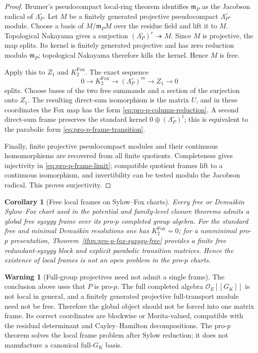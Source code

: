 \documentclass[11pt]{article}
\newtheorem{corollary}[theorem]{Corollary}
\theoremstyle{definition}
\newtheorem{warning}[theorem]{Warning}
\begin{document}
\begin{proof}
Brumer's pseudocompact local-ring theorem identifies
$\mathfrak m_P$ as the Jacobson radical of $\Lambda_P^{\circ}$.
Let $M$ be a finitely generated projective pseudocompact
$\Lambda_P^{\circ}$-module.  Choose a basis of
$M/\mathfrak m_PM$ over the residue field and lift it to $M$.
Topological Nakayama gives a surjection
$(\Lambda_P^{\circ})^r\twoheadrightarrow M$.  Since $M$ is projective,
the map splits.  Its kernel is finitely generated projective and has
zero reduction modulo $\mathfrak m_P$; topological Nakayama therefore
kills the kernel.  Hence $M$ is free.

Apply this to $Z_1$ and $K_2^{\mathrm{Fox}}$.  The exact sequence
\[
0\longrightarrow K_2^{\mathrm{Fox}}
\longrightarrow(\Lambda_P^{\circ})^m
\longrightarrow Z_1\longrightarrow0
\]
splits.  Choose bases of the two free summands and a section of the
surjection onto $Z_1$.  The resulting direct-sum isomorphism is the
matrix $U$, and in these coordinates the Fox map has the form
\eqref{eq:pro-p-column-reduction}.  A second direct-sum frame preserves
the standard kernel $0\oplus(\Lambda_P^{\circ})^t$; this is equivalent
to the parabolic form \eqref{eq:pro-p-frame-transition}.

Finally, finite projective pseudocompact modules and their continuous
homomorphisms are recovered from all finite quotients.  Completeness gives
injectivity in \eqref{eq:pro-p-frame-limit}; compatible quotient frames
lift to a continuous isomorphism, and invertibility can be tested modulo
the Jacobson radical.  This proves surjectivity.
\end{proof}

\begin{corollary}[Free local frames on Sylow--Fox charts]\label{cor:sylow-fox-free-frames}
Every free or Demu\v{s}kin Sylow--Fox chart used in the potential and
family-level closure theorems admits a global free syzygy frame over its
pro-$p$ completed group algebra.  For the standard free and minimal
Demu\v{s}kin resolutions one has $K_2^{\mathrm{Fox}}=0$; for a
nonminimal pro-$p$ presentation, Theorem~\ref{thm:pro-p-fox-syzygy-free}
provides a finite free redundant-syzygy block and explicit parabolic
transition matrices.  Hence the existence of local frames is not an open
problem in the pro-$p$ charts.
\end{corollary}

\begin{warning}[Full-group projectives need not admit a single frame]\label{warn:full-group-not-local}
The conclusion above uses that $P$ is pro-$p$.  The full completed algebra
$\mathcal O_E[[G_K]]$ is not local in general, and a finitely generated
projective full-transport module need not be free.  Therefore the global
object should not be forced into one matrix frame.  Its correct coordinates
are blockwise or Morita-valued, compatible with the residual determinant
and Cayley--Hamilton decompositions.  The pro-$p$ theorem solves the local
frame problem after Sylow reduction; it does not manufacture a canonical
full-$G_K$ basis.
\end{warning}
\end{document}
